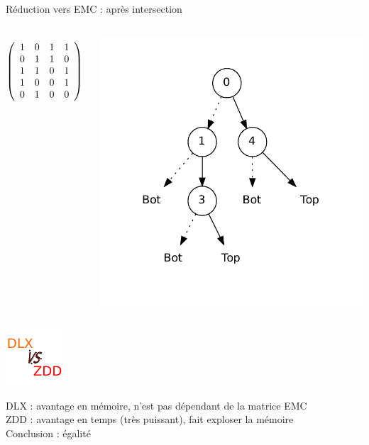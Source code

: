 \documentclass{beamer}
\begin{document}
\begin{frame}{Réduction vers EMC : après intersection}
  \begin{columns}

  \begin{displaymath}
   \left(\begin{array}{ c c c c c }
   1 & 0 & 1 & 1 \\
   0 & 1 & 1 & 0 \\
   1 & 1 & 0 & 1 \\
   1 & 0 & 0 & 1 \\
   0 & 1 & 0 & 0
  \end{array}\right)
  \end{displaymath}

    \includegraphics[height=0.8\textheight]{../imports/inter.pdf}
  \end{columns}
\end{frame}

\begin{frame}{}
\begin{center}
    \includegraphics[height=0.5\textheight]{../imports/vs.pdf}
\end{center}
DLX : avantage en mémoire, n'est pas dépendant de la matrice EMC\\
ZDD : avantage en temps (très puissant), fait exploser la mémoire \\
Conclusion : égalité
\end{frame}
\end{document}
